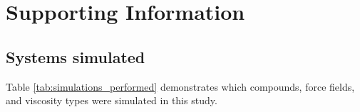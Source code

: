 \documentclass[preprint,review,12pt]{elsarticle}
\begin{document}
	
	
	
	\section{Supporting Information}
	
	
	\subsection{Systems simulated}
	
	Table \ref{tab:simulations_performed} demonstrates which compounds, force fields, and viscosity types were simulated in this study.
	
\end{document}
